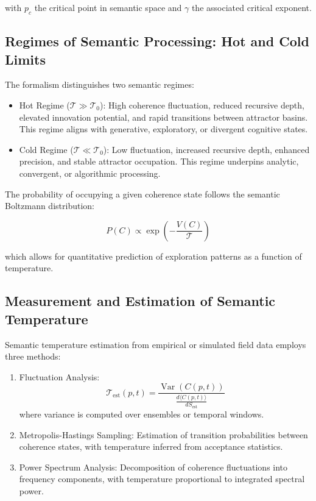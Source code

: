with \(p_c\) the critical point in semantic space and \(\gamma\) the associated critical exponent.

\subsection{Regimes of Semantic Processing: Hot and Cold Limits}

The formalism distinguishes two semantic regimes:

\begin{itemize}
    \item Hot Regime (\(\mathcal{T} \gg \mathcal{T}_0\)): High coherence fluctuation, reduced recursive depth, elevated innovation potential, and rapid transitions between attractor basins. This regime aligns with generative, exploratory, or divergent cognitive states.
    \item Cold Regime (\(\mathcal{T} \ll \mathcal{T}_0\)): Low fluctuation, increased recursive depth, enhanced precision, and stable attractor occupation. This regime underpins analytic, convergent, or algorithmic processing.
\end{itemize}

The probability of occupying a given coherence state follows the semantic Boltzmann distribution:

\begin{equation}
P(C) \propto \exp\left(-\frac{V(C)}{\mathcal{T}}\right)
\end{equation}

which allows for quantitative prediction of exploration patterns as a function of temperature.

\subsection{Measurement and Estimation of Semantic Temperature}

Semantic temperature estimation from empirical or simulated field data employs three methods:

\begin{enumerate}
    \item Fluctuation Analysis:
    \begin{equation}
    \mathcal{T}_{\text{est}}(p,t) = \frac{\operatorname{Var}(C(p,t))}{\frac{d\langle C(p,t) \rangle}{dS_{\text{est}}}}
    \end{equation}
    where variance is computed over ensembles or temporal windows.

    \item Metropolis-Hastings Sampling:  
    Estimation of transition probabilities between coherence states, with temperature inferred from acceptance statistics.

    \item Power Spectrum Analysis:  
    Decomposition of coherence fluctuations into frequency components, with temperature proportional to integrated spectral power.
\end{enumerate} 
